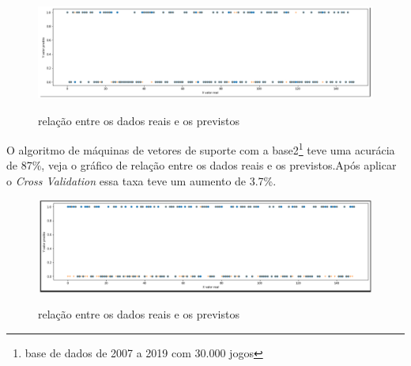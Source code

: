 \begin{figure}[htbp]
	\begin{center}
		\includegraphics[width=1.2\linewidth]{imagens/SVM.png}\\
	\end{center}
	\caption[relação entre os dados reais e os previstos]{relação entre os dados reais e os previstos}
	\label{fig:logo}
\end{figure}
\newpage
O algoritmo de máquinas de vetores de suporte com a base2\footnote[5]{base de dados de 2007 a 2019 com 30.000 jogos} teve uma acurácia de 87\%, veja o gráfico de relação entre os dados reais e os previstos.Após aplicar o \textit{Cross Validation} essa taxa teve um aumento de 3.7\%.
\begin{figure}[htbp]
	\begin{center}
		\includegraphics[width=1.2\linewidth]{imagens/SVMAPI.png}\\
	\end{center}
	\caption[relação entre os dados reais e os previstos]{relação entre os dados reais e os previstos}
	\label{fig:logo}
\end{figure}


